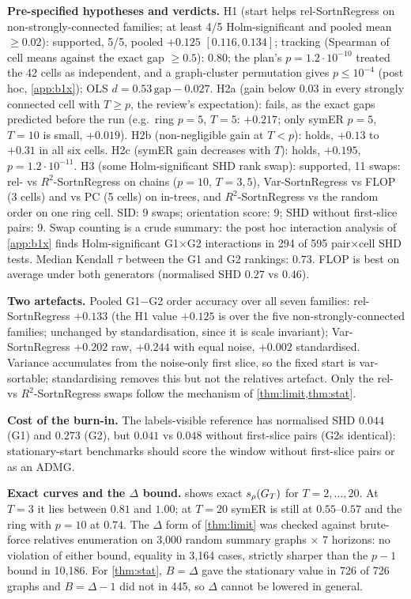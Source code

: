 \textbf{Pre-specified hypotheses and verdicts.}
H1 (start helps rel-SortnRegress on non-strongly-connected families; at least
4/5 Holm-significant and pooled mean $\ge0.02$): supported, 5/5, pooled
$+0.125$ $[0.116,0.134]$; tracking (Spearman of cell means against the exact
gap $\ge0.5$): $0.80$; the plan's $p=1.2\cdot10^{-10}$ treated the 42 cells as
independent, and a graph-cluster permutation gives $p\le10^{-4}$ (post hoc,
\cref{app:b1x}); OLS $d=0.53\,\text{gap}-0.027$.
H2a (gain below $0.03$ in every strongly connected cell with $T\ge p$, the
review's expectation): fails, as the exact gaps predicted before the run
(e.g.\ ring $p=5$, $T=5$: $+0.217$; only symER $p=5$, $T=10$ is small,
$+0.019$). H2b (non-negligible gain at $T<p$): holds, $+0.13$ to $+0.31$ in all
six cells. H2c (symER gain decreases with $T$): holds, $+0.195$,
$p=1.2\cdot10^{-11}$. H3 (some Holm-significant SHD rank swap): supported, 11
swaps: rel- vs $R^2$-SortnRegress on chains ($p=10$, $T=3,5$), Var-SortnRegress
vs FLOP (3 cells) and vs PC (5 cells) on in-trees, and $R^2$-SortnRegress vs the
random order on one ring cell. SID: 9 swaps; orientation score: 9; SHD without
first-slice pairs: 9. Swap counting is a crude summary: the post hoc
interaction analysis of \cref{app:b1x} finds Holm-significant G1$\times$G2
interactions in 294 of 595 pair$\times$cell SHD tests. Median Kendall $\tau$ between the G1 and G2 rankings:
$0.73$. FLOP is best on average under both generators (normalised SHD $0.27$
vs $0.46$).

\textbf{Two artefacts.} Pooled G1$-$G2 order accuracy over all seven
families: rel-SortnRegress $+0.133$ (the H1 value $+0.125$ is over the five
non-strongly-connected families; unchanged by standardisation, since it is scale invariant);
Var-SortnRegress $+0.202$ raw, $+0.244$ with equal noise, $+0.002$
standardised. Variance accumulates from the noise-only first slice, so the
fixed start is var-sortable; standardising removes this but not the relatives
artefact. Only the rel- vs $R^2$-SortnRegress swaps follow the mechanism of
\cref{thm:limit,thm:stat}.

\textbf{Cost of the burn-in.} The labels-visible reference has normalised SHD
$0.044$ (G1) and $0.273$ (G2), but $0.041$ vs $0.048$ without first-slice pairs
(G2s identical): stationary-start benchmarks should score the window without
first-slice pairs or as an ADMG.

\textbf{Exact curves and the $\Delta$ bound.}  shows exact
$s_\rho(G_T)$ for $T=2,\dots,20$. At $T=3$ it lies between $0.81$ and $1.00$; at
$T=20$ symER is still at $0.55$--$0.57$ and the ring with $p=10$ at $0.74$. The
$\Delta$ form of \cref{thm:limit} was checked against brute-force relatives
enumeration on 3{,}000 random summary graphs $\times$ 7 horizons: no violation
of either bound, equality in 3{,}164 cases, strictly sharper than the $p-1$
bound in 10{,}186. For \cref{thm:stat}, $B=\Delta$ gave the stationary value in
726 of 726 graphs and $B=\Delta-1$ did not in 445, so $\Delta$ cannot be
lowered in general.


